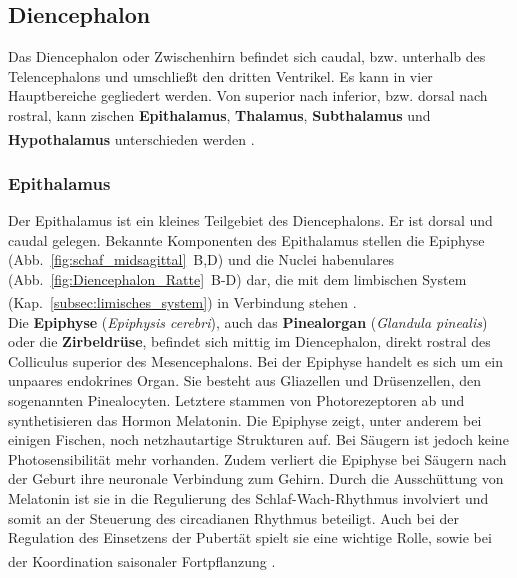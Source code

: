 
\subsection{Diencephalon}
\label{subsec:Diencephalon} 

Das Diencephalon oder Zwischenhirn befindet sich caudal, bzw. unterhalb des Telencephalons und umschließt den dritten Ventrikel. Es kann in vier Hauptbereiche gegliedert werden. Von superior nach inferior, bzw. dorsal nach rostral, kann zischen \textbf{Epithalamus}, \textbf{Thalamus}, \textbf{Subthalamus}  und \textbf{Hypothalamus} unterschieden werden \textsuperscript{\cite[Kap.~16]{crossman2014neuroanatomy}}.

\subsubsection{Epithalamus}
\label{subsubsec:Epithalamus} 

Der Epithalamus ist ein kleines Teilgebiet des Diencephalons. Er ist dorsal und caudal gelegen. Bekannte Komponenten des Epithalamus stellen die Epiphyse (Abb.~\ref{fig:schaf_midsagittal}~B,D) und die Nuclei habenulares (Abb.~\ref{fig:Diencephalon_Ratte}~B-D) dar, die mit dem limbischen System (Kap.~\ref{subsec:limisches_system}) in Verbindung stehen \textsuperscript{\cite[Kap.~12]{crossman2014neuroanatomy}}.\\

\noindent Die \textbf{Epiphyse} (\textit{Epiphysis cerebri}), auch das \textbf{Pinealorgan} (\textit{Glandula pinealis}) oder die \textbf{Zirbeldrüse}, befindet sich mittig im Diencephalon, direkt rostral des Colliculus superior des Mesencephalons. Bei der Epiphyse handelt es sich um ein unpaares endokrines Organ.
Sie besteht aus Gliazellen und Drüsenzellen, den sogenannten Pinealocyten. Letztere stammen von Photorezeptoren ab und synthetisieren das Hormon Melatonin. Die Epiphyse zeigt, unter anderem  bei einigen Fischen, noch netzhautartige Strukturen auf. Bei Säugern ist jedoch keine Photosensibilität mehr vorhanden. Zudem verliert die Epiphyse bei Säugern nach der Geburt ihre neuronale Verbindung zum Gehirn. Durch die Ausschüttung von Melatonin ist sie in die Regulierung des Schlaf-Wach-Rhythmus involviert und somit an der Steuerung des circadianen Rhythmus beteiligt. Auch bei der Regulation des Einsetzens der Pubertät spielt sie eine wichtige Rolle, sowie bei der Koordination saisonaler Fortpflanzung \textsuperscript{\cite[Kap.~13]{penzlin2005tierphys}}.

